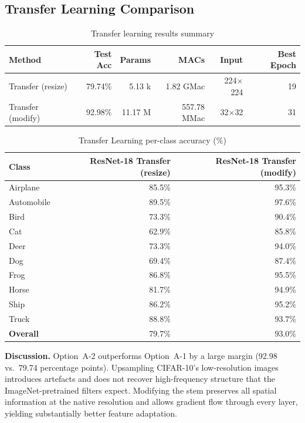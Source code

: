 \documentclass[12pt,a4paper]{article}
\begin{document}
\subsection{Transfer Learning Comparison}
\begin{table}[H]
  \centering
  \caption{Transfer learning results summary}
  \label{tab:transfer_summary}
  \begin{tabular}{lrrrrr}
    \toprule
    Method & Test Acc & Params & MACs & Input & Best Epoch \\
    \midrule
  Transfer (resize) & 79.74\% & 5.13 k & 1.82 GMac & 224$\times$224 & 19 \\
  Transfer (modify) & 92.98\% & 11.17 M & 557.78 MMac & 32$\times$32 & 31 \\
    \bottomrule
  \end{tabular}
\end{table}

\begin{table}[H]
  \centering
  \caption{Transfer Learning per-class accuracy (\%)}
  \label{tab:transfer_perclass}
  \begin{tabular}{lrr}
    \toprule
    Class & ResNet-18 Transfer (resize) & ResNet-18 Transfer (modify) \\
    \midrule
  Airplane & 85.5\% & 95.3\% \\
  Automobile & 89.5\% & 97.6\% \\
  Bird & 73.3\% & 90.4\% \\
  Cat & 62.9\% & 85.8\% \\
  Deer & 73.3\% & 94.0\% \\
  Dog & 69.4\% & 87.4\% \\
  Frog & 86.8\% & 95.5\% \\
  Horse & 81.7\% & 94.9\% \\
  Ship & 86.2\% & 95.2\% \\
  Truck & 88.8\% & 93.7\% \\
    \midrule
    \textbf{Overall} & 79.7\% & 93.0\% \\
    \bottomrule
  \end{tabular}
\end{table}

\textbf{Discussion.} Option~A-2 outperforms Option~A-1 by a large margin (92.98 vs.\ 79.74 percentage points). Upsampling CIFAR-10's low-resolution images introduces artefacts and does not recover high-frequency structure that the ImageNet-pretrained filters expect. Modifying the stem preserves all spatial information at the native resolution and allows gradient flow through every layer, yielding substantially better feature adaptation.
\end{document}
